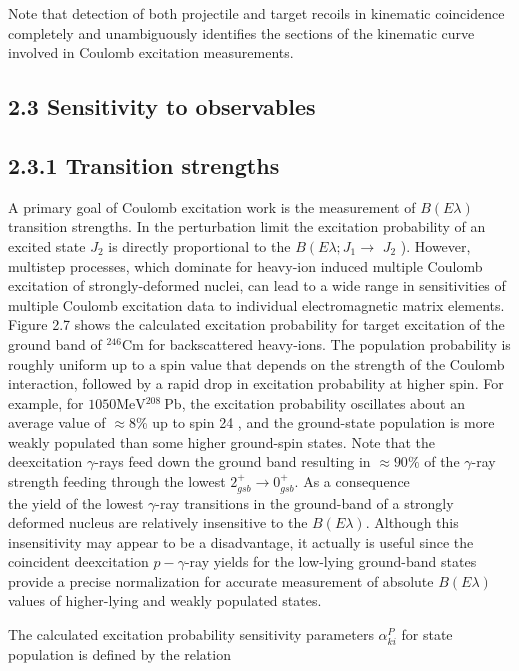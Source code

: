 \documentclass[10pt]{article}
\begin{document}
Note that detection of both projectile and target recoils in kinematic coincidence completely and unambiguously identifies the sections of the kinematic curve involved in Coulomb excitation measurements.

\subsection*{2.3 Sensitivity to observables}
\subsection*{2.3.1 Transition strengths}
A primary goal of Coulomb excitation work is the measurement of $B(E \lambda)$ transition strengths. In the perturbation limit the excitation probability of an excited state $J_{2}$ is directly proportional to the $B\left(E \lambda ; J_{1} \rightarrow\right.$ $J_{2}$ ). However, multistep processes, which dominate for heavy-ion induced multiple Coulomb excitation of strongly-deformed nuclei, can lead to a wide range in sensitivities of multiple Coulomb excitation data to individual electromagnetic matrix elements. Figure 2.7 shows the calculated excitation probability for target excitation of the ground band of ${ }^{246} \mathrm{Cm}$ for backscattered heavy-ions. The population probability is roughly uniform up to a spin value that depends on the strength of the Coulomb interaction, followed by a rapid drop in excitation probability at higher spin. For example, for $1050 \mathrm{MeV}{ }^{208} \mathrm{~Pb}$, the excitation probability oscillates about an average value of $\approx 8 \%$ up to spin 24 , and the ground-state population is more weakly populated than some higher ground-spin states. Note that the deexcitation $\gamma$-rays feed down the ground band resulting in $\approx 90 \%$ of the $\gamma$-ray strength feeding through the lowest $2_{g s b}^{+} \rightarrow 0_{g s b}^{+}$. As a consequence\\
the yield of the lowest $\gamma$-ray transitions in the ground-band of a strongly deformed nucleus are relatively insensitive to the $B(E \lambda)$. Although this insensitivity may appear to be a disadvantage, it actually is useful since the coincident deexcitation $p-\gamma$-ray yields for the low-lying ground-band states provide a precise normalization for accurate measurement of absolute $B(E \lambda)$ values of higher-lying and weakly populated states.

The calculated excitation probability sensitivity parameters $\alpha_{k i}^{P}$ for state population is defined by the relation
\end{document}
